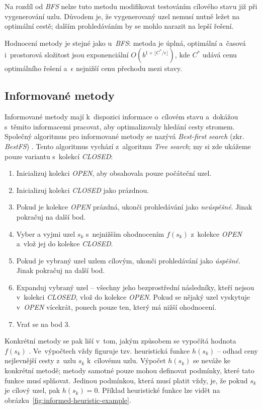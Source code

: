 Na rozdíl od \emph{BFS} nelze tuto metodu modifikovat testováním cílového stavu již při vygenerování uzlu. Důvodem je, že vygenerovaný uzel nemusí nutně ležet na optimální cestě; dalším prohledáváním by se mohlo narazit na lepší řešení.

Hodnocení metody je stejné jako u~\emph{BFS}: metoda je úplná, optimální a~časová i~prostorová složitost jsou exponenciální $O(b^{1 + \lfloor C^* / \epsilon \rfloor})$, kde $C^*$ udává cenu optimálního řešení a~$\epsilon$ nejnižší cenu přechodu mezi stavy.

\subsection*{Informované metody}

Informované metody mají k~dispozici informace o~cílovém stavu a~dokážou s~těmito informacemi pracovat, aby optimalizovaly hledání cesty stromem. Společný algoritmus pro informované metody se nazývá \emph{Best-first search} (zkr. \emph{BestFS}) \cite{AI_Russel_Norvig}. Tento algoritmus vychází z~algoritmu \emph{Tree search}; my si zde ukážeme pouze variantu s~kolekcí \emph{CLOSED}:
\begin{enumerate}
    \item Inicializuj kolekci \emph{OPEN}, aby obsahovala pouze počáteční uzel.
    \item Inicializuj kolekci \emph{CLOSED} jako prázdnou.
    \item Pokud je kolekce \emph{OPEN} prázdná, ukonči prohledávání jako \emph{neúspěšné}. Jinak pokračuj na další bod.
    \item Vyber a vyjmi uzel ${s_k}$ s~nejnižším ohodnocením $f(s_k)$ z~kolekce \emph{OPEN} a~vlož jej do kolekce \emph{CLOSED}.
    \item Pokud je vybraný uzel uzlem cílovým, ukonči prohledávání jako \emph{úspěšné}. Jinak pokračuj na další bod.
    \item Expanduj vybraný uzel -- všechny jeho bezprostřední následníky, kteří nejsou v~kolekci \emph{CLOSED}, vlož do kolekce \emph{OPEN}. Pokud se nějaký uzel vyskytuje v~\emph{OPEN} vícekrát, ponech pouze ten, který má nižší ohodnocení.
    \item Vrať se na bod 3.
\end{enumerate}

Konkrétní metody se pak liší v~tom, jakým způsobem se vypočítá hodnota ${f(s_k)}$ \cite{AI_Russel_Norvig}. Ve~výpočtech vždy figuruje tzv. heuristická funkce ${h(s_k)}$ -- odhad ceny nejlevnější cesty z~uzlu ${s_k}$ k~cílovému uzlu. Výpočet ${h(s_k)}$ se neváže ke konkrétní metodě; metody samotné pouze mohou definovat podmínky, které tato funkce musí splňovat. Jedinou podmínkou, která musí platit vždy, je, že pokud $s_k$ je cílový uzel, pak ${h(s_k) = 0}$. Příklad heuristické funkce lze vidět na obrázku~\ref{fig:informed-heuristic-example}.

